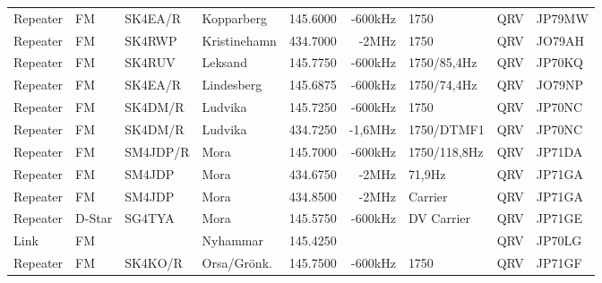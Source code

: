 \begin{landscape}
\begin{longtable}{llllrrlcl}
	Repeater                  & FM            & SK4EA/R       & Kopparberg          & 145.6000          & -600kHz        & 1750             & QRV             & JP79MW           \\
	Repeater                  & FM            & SK4RWP        & Kristinehamn        & 434.7000          & -2MHz          & 1750             & QRV             & JO79AH           \\
	Repeater                  & FM            & SK4RUV        & Leksand             & 145.7750          & -600kHz        & 1750/85,4Hz      & QRV             & JP70KQ           \\
	Repeater                  & FM            & SK4EA/R       & Lindesberg          & 145.6875          & -600kHz        & 1750/74,4Hz      & QRV             & JO79NP           \\
	Repeater                  & FM            & SK4DM/R       & Ludvika             & 145.7250          & -600kHz        & 1750             & QRV             & JP70NC           \\
	Repeater                  & FM            & SK4DM/R       & Ludvika             & 434.7250          & -1,6MHz        & 1750/DTMF1       & QRV             & JP70NC           \\
	Repeater                  & FM            & SM4JDP/R      & Mora                & 145.7000          & -600kHz        & 1750/118,8Hz     & QRV             & JP71DA           \\
	Repeater                  & FM            & SM4JDP        & Mora                & 434.6750          & -2MHz          & 71,9Hz           & QRV             & JP71GA           \\
	Repeater                  & FM            & SM4JDP        & Mora                & 434.8500          & -2MHz          & Carrier          & QRV             & JP71GA           \\
	Repeater                  & D-Star        & SG4TYA        & Mora                & 145.5750          & -600kHz        & DV Carrier       & QRV             & JP71GE           \\
	Link                      & FM            &               & Nyhammar            & 145.4250          &                &                  & QRV             & JP70LG           \\
	Repeater                  & FM            & SK4KO/R       & Orsa/Grönk.         & 145.7500          & -600kHz        & 1750             & QRV             & JP71GF           \\

\end{longtable}
\end{landscape}

